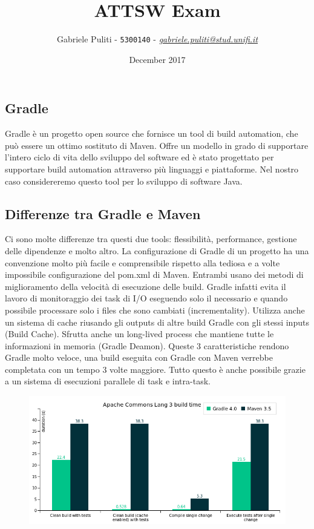 \documentclass{article}
\title{ATTSW Exam}
\author{Gabriele Puliti - \texttt{5300140} - \href{mailto:gabriele.puliti@stud.unifi.it}{\textit{gabriele.puliti@stud.unifi.it}}}
\date{December 2017}
\begin{document}
\maketitle

\begin{flushleft}


\section{Gradle} %
Gradle è un progetto open source che fornisce un tool di build automation, che può essere un ottimo sostituto di Maven. Offre un modello in grado di supportare l'intero ciclo di vita dello sviluppo del software ed è stato progettato per supportare build automation attraverso più linguaggi e piattaforme. Nel nostro caso considereremo questo tool per lo sviluppo di software Java.


\subsection{Differenze tra Gradle e Maven} %
Ci sono molte differenze tra questi due tools: flessibilità, performance, gestione delle dipendenze e molto altro. La configurazione di Gradle di un progetto ha una convenzione molto più facile e comprensibile rispetto alla tediosa e a volte impossibile configurazione del pom.xml di Maven. Entrambi usano dei metodi di miglioramento della velocità di esecuzione delle build. Gradle infatti evita il lavoro di monitoraggio dei task di I/O eseguendo solo il necessario e quando possibile processare solo i files che sono cambiati (incrementality). Utilizza anche un sistema di cache riusando gli outputs di altre build Gradle con gli stessi inputs (Build Cache). Sfrutta anche un long-lived process che mantiene tutte le informazioni in memoria (Gradle Deamon). Queste 3 caratteristiche rendono Gradle molto veloce, una build eseguita con Gradle con Maven verrebbe completata con un tempo 3 volte maggiore. Tutto questo è anche possibile grazie a un sistema di esecuzioni parallele di task e intra-task.
\begin{figure}[H]
\includegraphics[scale=0.70]{performance.png}
\end{figure} 



\end{flushleft}
\end{document}
